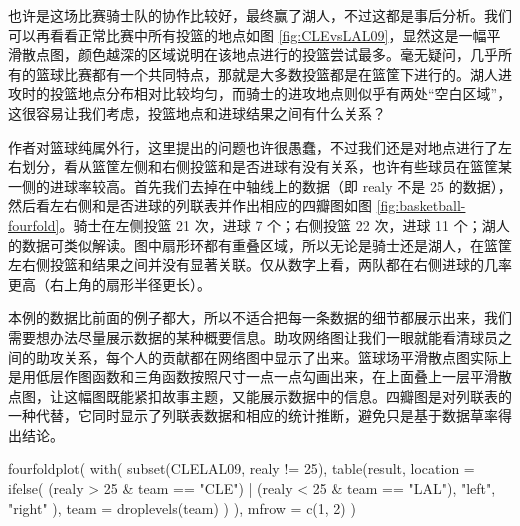 \documentclass[
  b5paper,
  UTF8,twoside]{book}
\newenvironment{Shaded}{\begin{snugshade}}{\end{snugshade}}
\newcommand{\AttributeTok}[1]{\textcolor[rgb]{0.77,0.63,0.00}{#1}}
\newcommand{\DecValTok}[1]{\textcolor[rgb]{0.00,0.00,0.81}{#1}}
\newcommand{\FunctionTok}[1]{\textcolor[rgb]{0.00,0.00,0.00}{#1}}
\newcommand{\NormalTok}[1]{#1}
\newcommand{\SpecialCharTok}[1]{\textcolor[rgb]{0.00,0.00,0.00}{#1}}
\newcommand{\StringTok}[1]{\textcolor[rgb]{0.31,0.60,0.02}{#1}}
\begin{document}
也许是这场比赛骑士队的协作比较好，最终赢了湖人，不过这都是事后分析。我们可以再看看正常比赛中所有投篮的地点如图 \ref{fig:CLEvsLAL09}，显然这是一幅平滑散点图，颜色越深的区域说明在该地点进行的投篮尝试最多。毫无疑问，几乎所有的篮球比赛都有一个共同特点，那就是大多数投篮都是在篮筐下进行的。湖人进攻时的投篮地点分布相对比较均匀，而骑士的进攻地点则似乎有两处``空白区域''，这很容易让我们考虑，投篮地点和进球结果之间有什么关系？

作者对篮球纯属外行，这里提出的问题也许很愚蠢，不过我们还是对地点进行了左右划分，看从篮筐左侧和右侧投篮和是否进球有没有关系，也许有些球员在篮筐某一侧的进球率较高。首先我们去掉在中轴线上的数据（即 realy 不是 25 的数据），然后看左右侧和是否进球的列联表并作出相应的四瓣图如图 \ref{fig:basketball-fourfold}。骑士在左侧投篮 21 次，进球 7 个；右侧投篮 22 次，进球 11 个；湖人的数据可类似解读。图中扇形环都有重叠区域，所以无论是骑士还是湖人，在篮筐左右侧投篮和结果之间并没有显著关联。仅从数字上看，两队都在右侧进球的几率更高（右上角的扇形半径更长）。

本例的数据比前面的例子都大，所以不适合把每一条数据的细节都展示出来，我们需要想办法尽量展示数据的某种概要信息。助攻网络图让我们一眼就能看清球员之间的助攻关系，每个人的贡献都在网络图中显示了出来。篮球场平滑散点图实际上是用低层作图函数和三角函数按照尺寸一点一点勾画出来，在上面叠上一层平滑散点图，让这幅图既能紧扣故事主题，又能展示数据中的信息。四瓣图是对列联表的一种代替，它同时显示了列联表数据和相应的统计推断，避免只是基于数据草率得出结论。

\begin{Shaded}
\begin{Highlighting}[]
\FunctionTok{fourfoldplot}\NormalTok{(}
  \FunctionTok{with}\NormalTok{(}
    \FunctionTok{subset}\NormalTok{(CLELAL09, realy }\SpecialCharTok{!=} \DecValTok{25}\NormalTok{),}
    \FunctionTok{table}\NormalTok{(result,}
      \AttributeTok{location =} \FunctionTok{ifelse}\NormalTok{(}
\NormalTok{        (realy }\SpecialCharTok{\textgreater{}} \DecValTok{25} \SpecialCharTok{\&}\NormalTok{ team }\SpecialCharTok{==} \StringTok{"CLE"}\NormalTok{) }\SpecialCharTok{|}\NormalTok{ (realy }\SpecialCharTok{\textless{}} \DecValTok{25} \SpecialCharTok{\&}\NormalTok{ team }\SpecialCharTok{==} \StringTok{"LAL"}\NormalTok{),}
        \StringTok{"left"}\NormalTok{, }\StringTok{"right"}
\NormalTok{      ),}
      \AttributeTok{team =} \FunctionTok{droplevels}\NormalTok{(team)}
\NormalTok{    )}
\NormalTok{  ),}
  \AttributeTok{mfrow =} \FunctionTok{c}\NormalTok{(}\DecValTok{1}\NormalTok{, }\DecValTok{2}\NormalTok{)}
\NormalTok{)}
\end{Highlighting}
\end{Shaded}
\end{document}
